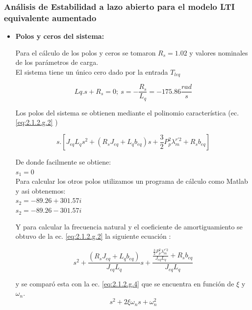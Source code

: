 \documentclass[10pt]{article}
\begin{document}
\subsubsection{Análisis de Estabilidad a lazo abierto para el modelo LTI equivalente aumentado}

\begin{itemize} 
\item \textbf{Polos y ceros del sistema:}

Para el cálculo de los polos y ceros se tomaron $R_{s}=1.02$ y valores nominales de los parámetros de carga.\\
El sistema tiene un único cero dado por la entrada $T_{leq}$

	\begin{equation}
	Lq . s + R_{s}=0; \ s=-\frac{R_{s}}{L_{q}} = -175.86 \frac{rad}{s}
	\label{eq:2.1.2.g.1}
	\end{equation}
	
Los polos del sistema se obtienen mediante el polinomio característica (ec. \ref{eq:2.1.2.g.2} )

	\begin{equation}
	s.[J_{eq}L_{q}s^{2}+(R_{s}J_{eq}+L_{q}b_{eq})s + \frac{3}{2}P_{p}^{2}\lambda ^{r'2}_{m}+R_{s}b_{eq}]
	\label{eq:2.1.2.g.2}
	\end{equation}
	
De donde facilmente se obtiene:\\
$s_{1}=0$\\

Para calcular los otros polos utilizamos un programa de cálculo como Matlab y asi obtenemos:\\
$s_{2}=-89.26 + 301.57 i$\\
$s_{2}=-89.26 - 301.57 i$

Y para calcular la frecuencia natural y el coeficiente de amortiguamiento se obtuvo de la ec. \ref{eq:2.1.2.g.2} la siguiente ecuación :

	\begin{equation}
	s^{2}+\frac{(R_{s}J_{eq}+L_{q}b_{eq})}{J_{eq}L_{q}}s +\frac{\frac{ \frac{3}{2}P_{p}^{2}\lambda ^{r'2}_{m}}{J_{eq}L_{q}}+R_{s}b_{eq}}{J_{eq}L_{q}}
	\label{eq:2.1.2.g.3}
	\end{equation}
	
y se comparó esta con la ec. \ref{eq:2.1.2.g.4} que se encuentra en función de $\xi$ y $\omega_{n}$.
	\begin{equation}
	s^{2}+2\xi \omega_{n} s + \omega_{n}^2 
	\label{eq:2.1.2.g.4}
	\end{equation}


\end{itemize}
\end{document}

